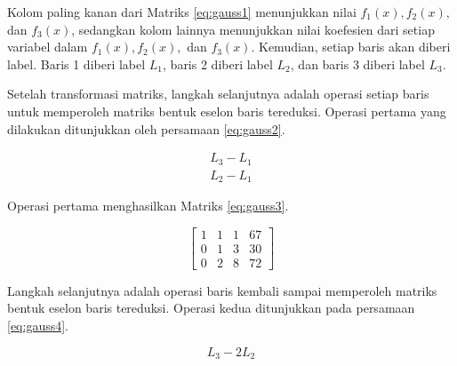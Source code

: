 Kolom paling kanan dari Matriks \ref{eq:gauss1} menunjukkan nilai \begin{math}f_1(x), f_2(x),\end{math} dan \begin{math}f_3(x)\end{math}, sedangkan kolom lainnya menunjukkan nilai koefesien dari setiap variabel dalam \begin{math}f_1(x), f_2(x),\end{math} dan \begin{math}f_3(x)\end{math}. Kemudian, setiap baris akan diberi label. Baris 1 diberi label \begin{math}L_1\end{math}, baris 2 diberi label \begin{math}L_2\end{math}, dan baris 3 diberi label \begin{math}L_3\end{math}.

Setelah transformasi matriks, langkah selanjutnya adalah operasi setiap baris untuk memperoleh matriks bentuk eselon baris tereduksi. Operasi pertama yang dilakukan ditunjukkan oleh persamaan \ref{eq:gauss2}.

\begin{gather}
	L_3 - L_1 \nonumber \\
	L_2 - L_1 \label{eq:gauss2}
\end{gather}

\begin{flushleft}
	Operasi pertama menghasilkan Matriks \ref{eq:gauss3}.
\end{flushleft}

\begin{center}
	\setlength\arraycolsep{10pt}
	\begin{equation}
		\begin{bmatrix}
				1 	& 1 	& 1 	& 67 		\\[1em]
				0 	& 1 	& 3 	& 30 		\\[1em]
				0 	& 2 	& 8 	& 72
		\end{bmatrix}
		\label{eq:gauss3}
	\end{equation}
\end{center}

Langkah selanjutnya adalah operasi baris kembali sampai memperoleh matriks bentuk eselon baris tereduksi. Operasi kedua ditunjukkan pada persamaan \ref{eq:gauss4}.

\begin{equation}
	L_3 - 2L_2 \label{eq:gauss4}
\end{equation}

